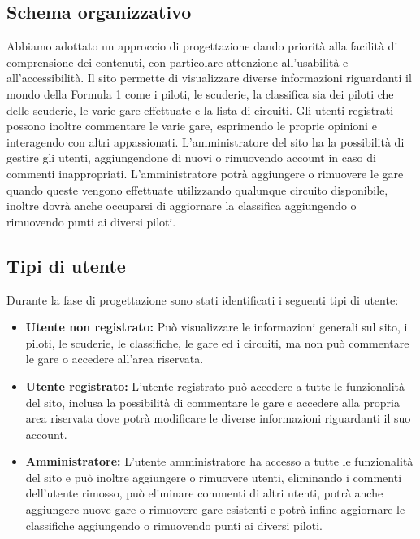 \documentclass[11pt,a4paper]{article}
\begin{document}
\subsection{Schema organizzativo}
Abbiamo adottato un approccio di progettazione dando priorità alla facilità di comprensione dei contenuti, con particolare attenzione all'usabilità e all'accessibilità. 
Il sito permette di visualizzare diverse informazioni riguardanti il mondo della Formula 1 come i piloti, le scuderie, la classifica sia dei piloti che delle scuderie, le varie gare effettuate e la lista di circuiti.
Gli utenti registrati possono inoltre commentare le varie gare, esprimendo le proprie opinioni e interagendo con altri appassionati. L'amministratore del sito ha la possibilità di gestire gli utenti, aggiungendone di nuovi o rimuovendo account in caso di commenti inappropriati.
L'amministratore potrà aggiungere o rimuovere le gare quando queste vengono effettuate utilizzando qualunque circuito disponibile, inoltre dovrà anche occuparsi di aggiornare la classifica aggiungendo o rimuovendo punti ai diversi piloti.
\subsection{Tipi di utente}
Durante la fase di progettazione sono stati identificati i seguenti tipi di utente:
\begin{itemize}
    \item \textbf{Utente non registrato:} Può visualizzare le informazioni generali sul sito, i piloti, le scuderie, le classifiche, le gare ed i circuiti, ma non può commentare le gare o accedere all'area riservata.
    \item \textbf{Utente registrato:} L'utente registrato può accedere a tutte le funzionalità del sito, inclusa la possibilità di commentare le gare e accedere alla propria area riservata dove potrà modificare le diverse informazioni riguardanti il suo account.
    \item \textbf{Amministratore:} L'utente amministratore ha accesso a tutte le funzionalità del sito e può inoltre aggiungere o rimuovere utenti, eliminando i commenti dell'utente rimosso, può eliminare commenti di altri utenti, potrà anche aggiungere nuove gare o rimuovere gare esistenti e potrà infine aggiornare le classifiche aggiungendo o rimuovendo punti ai diversi piloti.
\end{itemize}
\end{document}
